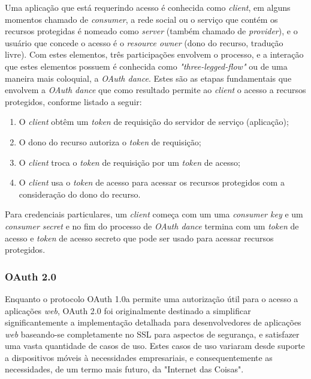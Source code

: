 Uma aplicação que está requerindo acesso é conhecida como \textit{client}, em alguns momentos chamado de \textit{consumer}, a rede social ou o serviço que contém os recursos protegidas é nomeado como \textit{server} (também chamado de \textit{provider}), e o usuário que concede o acesso é o \textit{resource owner} (dono do recurso, tradução livre). Com estes elementos, três participações envolvem o processo, e a interação que estes elementos possuem é conhecida como \textit{"three-legged-flow"} ou de uma maneira mais coloquial, a \textit{OAuth dance}. Estes são as etapas fundamentais que envolvem a \textit{OAuth dance} que como resultado permite ao \textit{client} o acesso a recursos protegidos, conforme listado a seguir: \cite{mining-social-web}

\begin{enumerate}
	\item O \textit{client} obtêm um \textit{token} de requisição do servidor de serviço (aplicação);
	\item O dono do recurso autoriza o \textit{token} de requisição;
	\item O \textit{client} troca o \textit{token} de requisição por um \textit{token} de acesso;
	\item O \textit{client} usa o \textit{token} de acesso para acessar os recursos protegidos com a consideração do dono do recurso.
\end{enumerate}

Para credenciais particulares, um \textit{client} começa com um uma \textit{consumer key} e um \textit{consumer secret} e no fim do processo de \textit{OAuth dance} termina com um \textit{token} de acesso e \textit{token} de acesso secreto que pode ser usado para acessar recursos protegidos.

\subsubsection{OAuth 2.0}
Enquanto o protocolo OAuth 1.0a permite uma autorização útil para o acesso a aplicações \textit{web}, OAuth 2.0 foi originalmente destinado a simplificar significantemente a implementação detalhada para desenvolvedores de aplicações \textit{web} baseando-se completamente no SSL para aspectos de segurança, e satisfazer uma vasta quantidade de casos de uso. Estes casos de uso variaram desde suporte a dispositivos móveis à necessidades empresariais, e consequentemente as necessidades, de um termo mais futuro, da "Internet das Coisas".

